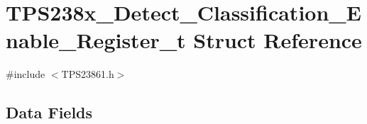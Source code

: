 \hypertarget{struct_t_p_s238x___detect___classification___enable___register__t}{\section{T\-P\-S238x\-\_\-\-Detect\-\_\-\-Classification\-\_\-\-Enable\-\_\-\-Register\-\_\-t Struct Reference}
\label{struct_t_p_s238x___detect___classification___enable___register__t}
}


{\ttfamily \#include $<$T\-P\-S23861.\-h$>$}

\subsection*{Data Fields}
